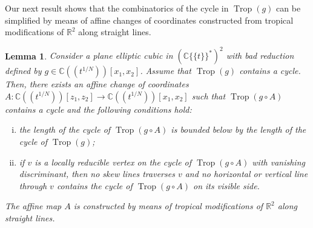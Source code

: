 \documentclass[11pt]{amsart}
\numberwithin{equation}{section}
\theoremstyle{plain}
\newtheorem{lemma}[theorem]{Lemma}
\theoremstyle{definition}
\theoremstyle{remark}
\begin{document}
Our next result shows that the combinatorics of the
cycle in $\operatorname{Trop}(g)$ can be simplified by means of affine changes of coordinates 
constructed from tropical modifications of ${\mathbb{R}}^2$ along
straight lines.
\begin{lemma} \label{lem:atMostTwo} Consider a plane elliptic cubic in
  $({{\mathbb{C}}\{\!\{t
\}\!\}}^*)^2$ with bad reduction defined by $g\in
  {{\mathbb{C}}(\!(t^{1/N})\!)}[x_1,x_2]$. Assume that $\operatorname{Trop}(g)$ contains a cycle. Then, there
  exists an affine change of coordinates $A\colon {{\mathbb{C}}(\!(t^{1/N})\!)}[z_1,z_2]\to
  {{\mathbb{C}}(\!(t^{1/N})\!)}[x_1,x_2]$ such that $\operatorname{Trop}(g\circ A)$ contains a cycle and the
  following conditions hold:
  \begin{enumerate}[(i)]
\item the length of the cycle of $\operatorname{Trop}(g\circ A)$ is bounded below by the length of the cycle of $\operatorname{Trop}(g)$;
\item if $v$ is a locally reducible vertex on the cycle of
  $\operatorname{Trop}(g\circ A)$ with vanishing discriminant, then no skew lines
  traverses $v$ and no horizontal or vertical line through $v$
  contains the cycle of $\operatorname{Trop}(g\circ A)$ on its    {visible side}.
  \end{enumerate}
The affine map  $A$ is constructed by means of tropical modifications
of ${\mathbb{R}}^2$ along straight lines.
\end{lemma}
\end{document}
